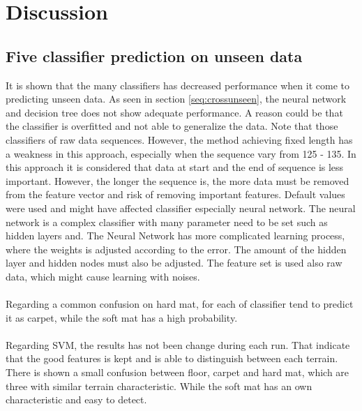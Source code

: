 \documentclass[USenglish]{ifimaster}  %
\begin{document}
\chapter{Discussion}

\section{Five classifier prediction on unseen data}
It is shown that the many classifiers has decreased performance when it come to predicting unseen data. As seen in section \ref{seq:crossunseen}, the neural network and decision tree does not show adequate performance. A reason could be that the classifier is overfitted and not able to generalize the data. Note that those classifiers of raw data sequences. However, the method achieving fixed length has a weakness in this approach, especially when the sequence vary from 125 - 135. In this approach it is considered that data at start and the end of sequence is less important. However, the longer the sequence is, the more data must be removed from the feature vector and risk of removing important features. Default values were used and might have affected classifier especially neural network. The neural network is a complex classifier with many parameter need to be set such as hidden layers and. The Neural Network has more complicated learning process, where the weights is adjusted according to the error. The amount of the hidden layer and hidden nodes must also be adjusted. The feature set is used also raw data, which might cause learning with noises.
\\
\\
Regarding a common confusion on hard mat, for each of classifier tend to predict it as carpet, while the soft mat has a high probability.
\\
\\
Regarding SVM, the results has not been change during each run. That indicate that the good features is kept and is able to distinguish between each terrain. There is shown a small confusion between floor, carpet and hard mat, which are three with similar terrain characteristic. While the soft mat has an own characteristic and easy to detect. 
\end{document}
